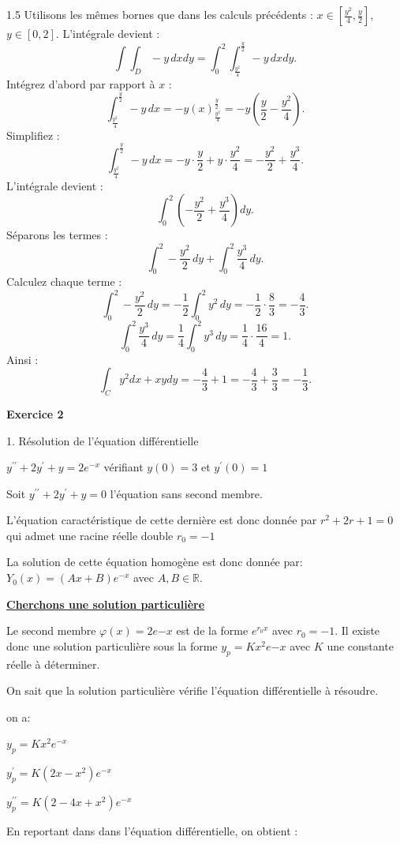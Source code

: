 \documentclass[12pt]{article}
\begin{document}
\begin{spacing}{1.5}
Utilisons les m\^emes bornes que dans les calculs pr\'ec\'edents : \(x \in [\frac{y^2}{4}, \frac{y}{2}]\), \(y \in [0, 2]\). L'int\'egrale devient :
\[
\int\int_D -y \, dxdy = \int_0^2 \int_{\frac{y^2}{4}}^{\frac{y}{2}} -y \, dxdy.
\]
Int\'egrez d'abord par rapport \`a \(x\) :
\[
\int_{\frac{y^2}{4}}^{\frac{y}{2}} -y \, dx = -y \left(x\right)_{\frac{y^2}{4}}^{\frac{y}{2}} = -y \left(\frac{y}{2} - \frac{y^2}{4}\right).
\]
Simplifiez :
\[
\int_{\frac{y^2}{4}}^{\frac{y}{2}} -y \, dx = -y \cdot \frac{y}{2} + y \cdot \frac{y^2}{4} = -\frac{y^2}{2} + \frac{y^3}{4}.
\]
L'int\'egrale devient :
\[
\int_0^2 \left(-\frac{y^2}{2} + \frac{y^3}{4}\right) dy.
\]
S\'eparons les termes :
\[
\int_0^2 -\frac{y^2}{2} \, dy + \int_0^2 \frac{y^3}{4} \, dy.
\]
Calculez chaque terme :
\[
\int_0^2 -\frac{y^2}{2} \, dy = -\frac{1}{2} \int_0^2 y^2 \, dy = -\frac{1}{2} \cdot \frac{8}{3} = -\frac{4}{3}.
\]
\[
\int_0^2 \frac{y^3}{4} \, dy = \frac{1}{4} \int_0^2 y^3 \, dy = \frac{1}{4} \cdot \frac{16}{4} = 1.
\]
Ainsi :
\[
\int_C y^2 dx + xy dy = -\frac{4}{3} + 1 = -\frac{4}{3} + \frac{3}{3} = -\frac{1}{3}.
\]

\medskip\textbf{Exercice 2}

1. Résolution de l'équation différentielle

$y^{\prime\prime}+2y^{\prime}+y=2e^{-x}$ vérifiant $y(0)=3$ et $y^{\prime}(0)=1$

Soit $y^{\prime\prime}+2y^{\prime}+y=0$ l'équation sans second membre. 

L'équation caractéristique de cette dernière est donc donnée par $r^2+2r+1=0$ qui admet une racine réelle double $r_0=-1$

La solution de cette équation homogène est donc donnée par: $Y_0(x)=(Ax+B)e^{-x}$ avec  $A,B \in \mathbb{R}$.

\medskip\underline{\textbf{Cherchons une solution particulière}}

Le second membre $\varphi(x)=2e{-x}$ est de la forme $e^{r_0x}$ avec $r_0=-1$. Il existe donc une solution particulière  sous la forme $y_p=Kx^2e{-x}$ avec $K$ une constante réelle à déterminer.

On sait que la solution particulière vérifie l'équation différentielle à résoudre.

on a:

$y_p=Kx^2e^{-x}$

$y_{p}^{\prime}=K(2x-x^2)e^{-x}$

$y_{p}^{\prime\prime}=K(2-4x+x^2)e^{-x}$

En reportant dans dans l'équation différentielle, on obtient :


\end{spacing}
\end{document}
